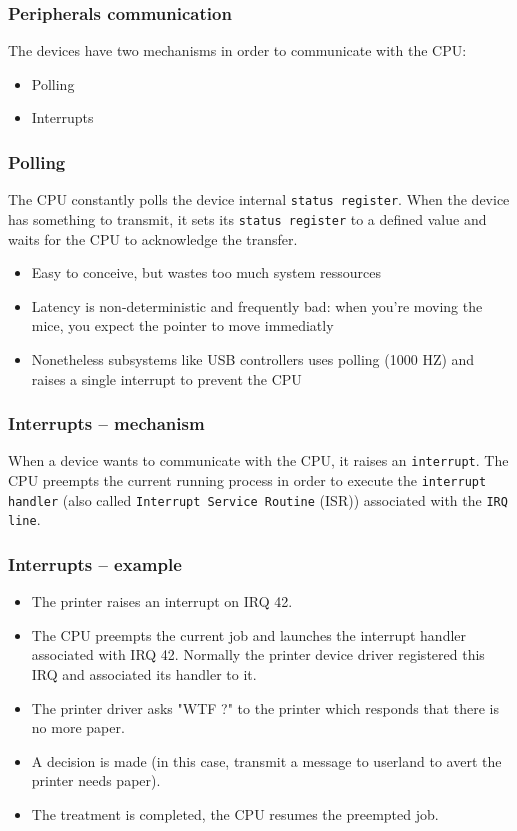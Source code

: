 \documentclass{beamer}
\begin{document}
\begin{frame}
  \frametitle{Peripherals communication}

  The devices have two mechanisms in order to communicate with the CPU:\\
  \begin{itemize}
  \item
    Polling
  \item
    Interrupts
  \end{itemize}
\end{frame}

\begin{frame}
  \frametitle{Polling}

  The CPU constantly polls the device internal \texttt{status register}. When the device has something to transmit, it sets its \texttt{status register} to a defined value and waits for the CPU to acknowledge the transfer.\\
  \begin{itemize}
  \item
    Easy to conceive, but wastes too much system ressources
  \item
    Latency is non-deterministic and frequently bad: when you're moving the mice, you expect the pointer to move immediatly
  \item
    Nonetheless subsystems like USB controllers uses polling (1000 HZ) and raises a single interrupt to prevent the CPU
  \end{itemize}
\end{frame}

\begin{frame}
  \frametitle{Interrupts -- mechanism}

  When a device wants to communicate with the CPU, it raises an \texttt{interrupt}. The CPU preempts the current running process in order to execute the \texttt{interrupt handler} (also called \texttt{Interrupt Service Routine} (ISR)) associated with the \texttt{IRQ line}.\\
\end{frame}

\begin{frame}
  \frametitle{Interrupts -- example}

  \begin{itemize}
  \item<1->
    The printer raises an interrupt on IRQ 42.
  \item<2->
    The CPU preempts the current job and launches the interrupt handler associated with IRQ 42. Normally the printer device driver registered this IRQ and associated its handler to it.
  \item<3->
    The printer driver asks "WTF ?" to the printer which responds that there is no more paper.
  \item<4->
    A decision is made (in this case, transmit a message to userland to avert the printer needs paper).
  \item<5->
    The treatment is completed, the CPU resumes the preempted job.
  \end{itemize}
\end{frame}
\end{document}
